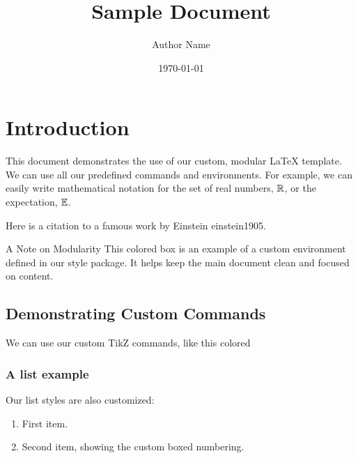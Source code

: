 \documentclass{e_class_noteLong}
\title{Sample Document}
\author{Author Name}
\date{\today}
\begin{document}

\maketitle
\mytoc

\chapter{Introduction}

This document demonstrates the use of our custom, modular \LaTeX{} template.
We can use all our predefined commands and environments. For example, we can easily write mathematical notation for the set of real numbers, $\mathbb{R}$, or the expectation, $\mathbb{E}$.

Here is a citation to a famous work by Einstein einstein1905.

\begin{special_columns}{A Note on Modularity}
    This colored box is an example of a custom environment defined in our style package. It helps keep the main document clean and focused on content.
\end{special_columns}

\section{Demonstrating Custom Commands}

We can use our custom TikZ commands, like this colored

\subsection{A list example}
Our list styles are also customized:
\begin{enumerate}
    \item First item.
    \item Second item, showing the custom boxed numbering.
\end{enumerate}
\end{document}
